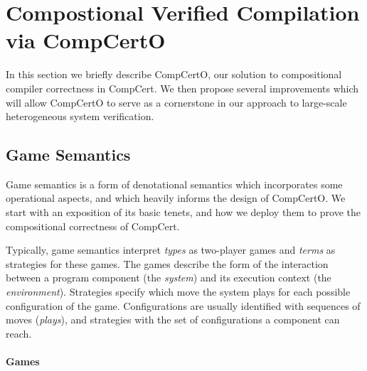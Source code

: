 \section{Compostional Verified Compilation via CompCertO}

In this section we briefly describe CompCertO,
our solution to compositional compiler correctness in CompCert.
We then propose several improvements which will
allow CompCertO to serve as a cornerstone
in our approach to large-scale heterogeneous system verification.

\subsection{Game Semantics} \label{sec:gamesem} %


Game semantics is a form of denotational semantics which
incorporates some operational aspects,
and which heavily informs the design of CompCertO.
We start with an exposition of its basic tenets,
and how we deploy them to prove the compositional correctness of CompCert.

Typically,
game semantics interpret
\emph{types} as two-player games
and \emph{terms} as strategies for these games.
The games describe the form of the interaction
between a program component %
(the \emph{system})
and its execution context
(the \emph{environment}).
Strategies
specify which move the system plays
for each possible configuration of the game.
Configurations are usually identified with sequences of moves
(\emph{plays}),
and strategies with the set of configurations
a component can reach.



\paragraph{Games} \label{sec:mainideas:gs:games} %

